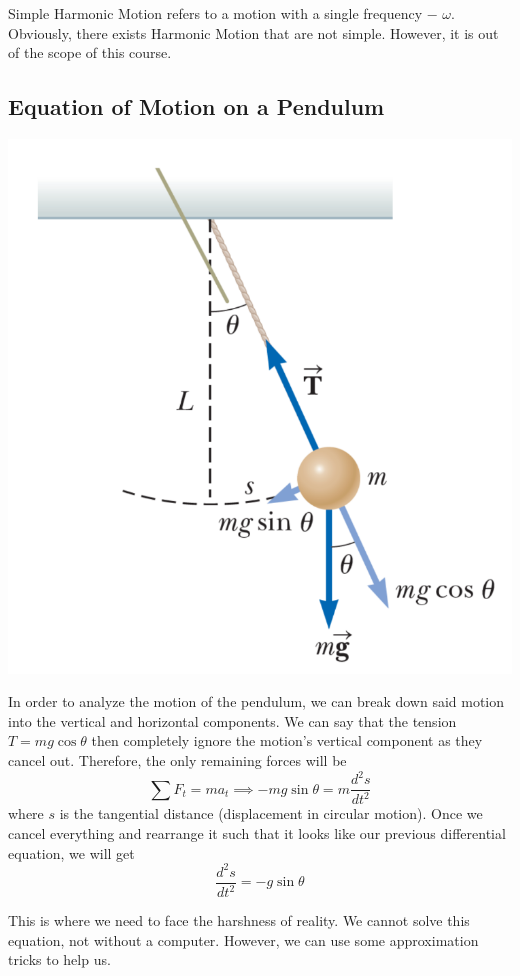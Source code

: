 Simple Harmonic Motion refers to a motion with a single frequency $-$ $\omega$.
Obviously, there exists Harmonic Motion that are not simple. However, it is out of the scope of this course.

\subsection{Equation of Motion on a Pendulum}

\begin{center}
\includegraphics[scale=0.3]{images/oaw/pendulum01.png}
\end{center}

In order to analyze the motion of the pendulum, we can break down said motion into the vertical and
horizontal components. We can say that the tension $T = mg\cos\theta$ then completely ignore the motion's
vertical component as they cancel out. Therefore, the only remaining forces will be
\[\sum F_t = ma_t \implies -mg\sin\theta = m\frac{d^2s}{dt^2}\]
where $s$ is the tangential distance (displacement in circular motion). Once we cancel everything
and rearrange it such that it looks like our previous differential equation, we will get
\[ \frac{d^2s}{dt^2} = -g\sin\theta \]

This is where we need to face the harshness of reality. We cannot solve this equation, not without
a computer. However, we can use some approximation tricks to help us.

